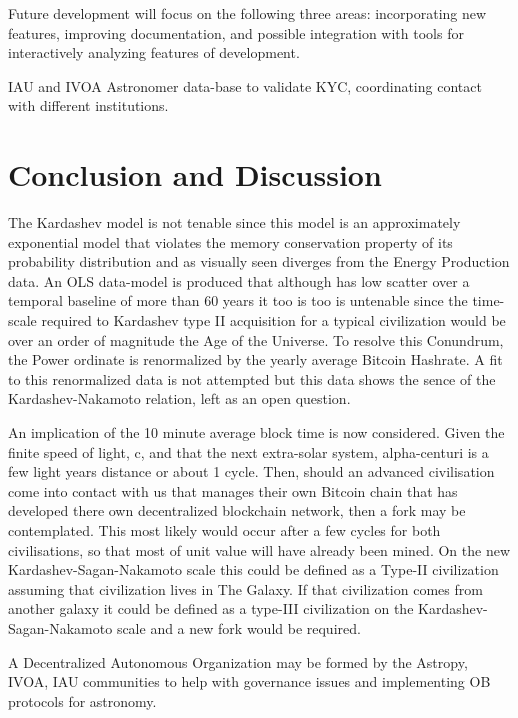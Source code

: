 \documentclass[final,5p,times,twocolumn,authoryear]{elsarticle}
\begin{document}
Future development will focus on the following three areas: incorporating
new features, improving documentation, and 
possible integration with tools for interactively analyzing features of development.

IAU and IVOA Astronomer data-base to validate KYC, coordinating contact with different institutions. 

\section{Conclusion and Discussion}
\label{sec:conc}
The Kardashev model is not tenable since this model is an approximately exponential model that violates the memory conservation property of its probability distribution and as visually seen diverges from the Energy Production data. An OLS data-model is produced that although has low scatter over a temporal baseline of more than 60 years it too is too is untenable since the time-scale required to Kardashev type II acquisition for a typical civilization would be over an order of magnitude the Age of the Universe. To resolve this Conundrum, the Power ordinate is renormalized by the yearly average Bitcoin Hashrate. A fit to this renormalized data is not attempted but this data shows the sence of the Kardashev-Nakamoto relation, left as an open question. 

An implication of the 10 minute average block time is now considered. Given the finite speed of light, c, and that the next extra-solar system, alpha-centuri is a few light years distance or about 1 cycle.  Then, should an advanced civilisation come into contact with us that manages their own Bitcoin chain that has developed there own decentralized blockchain network, then a fork may be contemplated. This most likely would occur after a few cycles for both civilisations, so that most of unit value  will have already been mined. On the new Kardashev-Sagan-Nakamoto scale this could be defined as a Type-II civilization assuming that civilization lives in The Galaxy. If that civilization comes from another galaxy it could be defined as a type-III civilization on the Kardashev-Sagan-Nakamoto scale and a new fork would be required.

A Decentralized Autonomous Organization may be formed by the Astropy, IVOA, IAU communities to help with governance issues and implementing OB protocols for astronomy.
\end{document}
